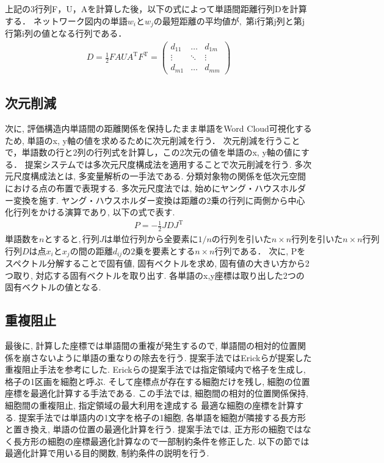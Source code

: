 \documentclass[syuuron]{kuee}
\begin{document}
			上記の3行列F，U，Aを計算した後，以下の式によって単語間距離行列Dを計算する．
			$ネットワーク図内の単語w_iとw_jの最短距離の平均値が, $
			第i行第j列と第j行第i列の値となる行列である．
			\begin{eqnarray}
			 D = \frac{1}{2} FAUA^{\mathrm{T}}F^{\mathrm{T}}
			   = \left(
			    \begin{array}{cccc}
			    	d_{11} & \ldots & d_{1m} \\
			    	\vdots & \ddots & \vdots \\
			    	d_{m1} & \ldots & d_{mm}
				\end{array}
			 \right)
			\end{eqnarray}	
			
		\subsection{次元削減}
			次に, 評価構造内単語間の距離関係を保持したまま単語をWord Cloud可視化するため, 単語のx, y軸の値を求めるために次元削減を行う．
			次元削減を行うことで，単語数の行と2列の行列式を計算し，この2次元の値を単語のx, y軸の値にする．
			提案システムでは多次元尺度構成法を適用することで次元削減を行う. 
			多次元尺度構成法とは, 多変量解析の一手法である.  分類対象物の関係を低次元空間における点の布置で表現する. 
			多次元尺度法では, 始めにヤング・ハウスホルダー変換を施す. 
			ヤング・ハウスホルダー変換は距離の2乗の行列に両側から中心化行列をかける演算であり, 以下の式で表す. 
			\begin{eqnarray}
				P = - \frac{1}{2} JDJ^{\mathrm{T}}
			\end{eqnarray}
			$単語数をnとすると, 行列Jは単位行列から全要素に1/nの行列を引いたn \times n行列を引いたn \times n行列$
			$行列Dは点 x_i と x_j の間の距離 d_{ij} の2乗を要素とするn×n行列である．$
			次に, Pをスペクトル分解することで固有値, 固有ベクトルを求め, 固有値の大きい方から2つ取り, 対応する固有ベクトルを取り出す. 
			各単語のx,y座標は取り出した2つの固有ベクトルの値となる. 
			
		\subsection{重複阻止}
			最後に, 計算した座標では単語間の重複が発生するので, 単語間の相対的位置関係を崩さないように単語の重なりの除去を行う. 
			提案手法ではErickらが提案した重複阻止手法を参考にした\cite{or2}. 
			Erickらの提案手法では指定領域内で格子を生成し, 格子の1区画を細胞と呼ぶ. 
			そして座標点が存在する細胞だけを残し, 細胞の位置座標を最適化計算する手法である. 
			この手法では, 細胞間の相対的位置関係保持, 細胞間の重複阻止, 指定領域の最大利用を達成する
			最適な細胞の座標を計算する. 
			提案手法では単語内の1文字を格子の1細胞, 各単語を細胞が隣接する長方形と置き換え, 単語の位置の最適化計算を行う. 
			提案手法では, 正方形の細胞ではなく長方形の細胞の座標最適化計算なので一部制約条件を修正した. 
			以下の節では最適化計算で用いる目的関数, 制約条件の説明を行う. 
			
\end{document}
